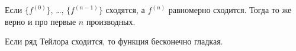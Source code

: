 \documentclass[12pt,a4paper]{article}
\begin{document}
    \begin{corollary}
        Если $\{f^{(0)}\}$, \dots, $\{f^{(n-1)}\}$ сходятся, а $f^{(n)}$ равномерно сходится. Тогда то же верно и про первые $n$ производных.
    \end{corollary}

    \begin{corollary}
        Если ряд Тейлора сходится, то функция бесконечно гладкая.
    \end{corollary}
\end{document}
